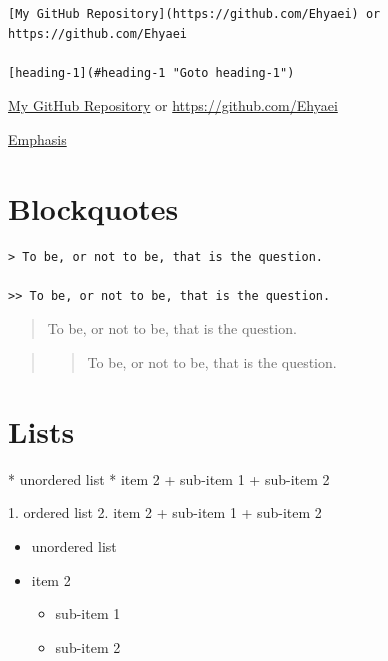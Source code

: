 \documentclass[
]{book}
\newenvironment{Shaded}{\begin{snugshade}}{\end{snugshade}}
\newcommand{\NormalTok}[1]{#1}
\providecommand{\tightlist}{%
  \setlength{\itemsep}{0pt}\setlength{\parskip}{0pt}}
\begin{document}
\begin{verbatim}
[My GitHub Repository](https://github.com/Ehyaei) or https://github.com/Ehyaei

[heading-1](#heading-1 "Goto heading-1")
\end{verbatim}

\href{https://github.com/Ehyaei}{My GitHub Repository} or \url{https://github.com/Ehyaei}

\protect\hyperlink{Emphasis}{Emphasis}

\hypertarget{blockquotes}{%
\section{Blockquotes}\label{blockquotes}}

\begin{verbatim}
> To be, or not to be, that is the question.

>> To be, or not to be, that is the question.
\end{verbatim}

\begin{quote}
To be, or not to be, that is the question.
\end{quote}

\begin{quote}
\begin{quote}
To be, or not to be, that is the question.
\end{quote}
\end{quote}

\hypertarget{lists}{%
\section{Lists}\label{lists}}

\begin{Shaded}
\begin{Highlighting}[]
\NormalTok{* unordered list }
\NormalTok{* item 2\textasciigrave{}  }
\NormalTok{     + sub{-}item 1  }
\NormalTok{     + sub{-}item 2  }

\NormalTok{1. ordered list\textasciigrave{}  }
\NormalTok{2. item 2\textasciigrave{}  }
\NormalTok{     + sub{-}item 1  }
\NormalTok{     + sub{-}item 2  }
\end{Highlighting}
\end{Shaded}

\begin{itemize}
\tightlist
\item
  unordered list
\item
  item 2

  \begin{itemize}
  \tightlist
  \item
    sub-item 1
  \item
    sub-item 2
  \end{itemize}
\end{itemize}
\end{document}
